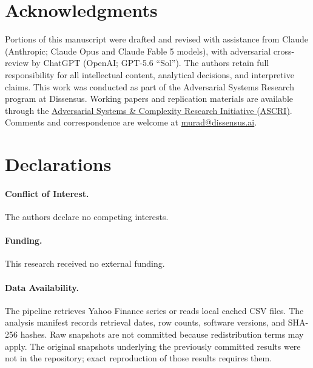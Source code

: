 \documentclass[11pt]{article}
\begin{document}

\section*{Acknowledgments}

Portions of this manuscript were drafted and revised with assistance from Claude (Anthropic; Claude Opus and Claude Fable 5 models), with adversarial cross-review by ChatGPT (OpenAI; GPT-5.6 ``Sol''). The authors retain full responsibility for all intellectual content, analytical decisions, and interpretive claims. This work was conducted as part of the Adversarial Systems Research program at Dissensus. Working papers and replication materials are available through the \href{https://systems.ac}{Adversarial Systems \& Complexity Research Initiative (ASCRI)}. Comments and correspondence are welcome at \href{mailto:murad@dissensus.ai}{murad@dissensus.ai}.


\section*{Declarations}

\paragraph{Conflict of Interest.} The authors declare no competing interests.

\paragraph{Funding.} This research received no external funding.

\paragraph{Data Availability.} The pipeline retrieves Yahoo Finance series or reads local cached CSV files. The analysis manifest records retrieval dates, row counts, software versions, and SHA-256 hashes. Raw snapshots are not committed because redistribution terms may apply. The original snapshots underlying the previously committed results were not in the repository; exact reproduction of those results requires them.
\end{document}
